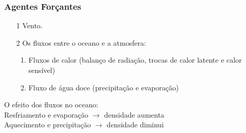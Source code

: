 
\begin{frame}
  \frametitle{Agentes Forçantes}
  \begin{itemize}[<+-| alert@+>]
    \item[1] Vento.
    \item[2] Os fluxos entre o oceano e a atmosfera:
    \begin{enumerate}[<+-| alert@+>]
      \item Fluxos de calor (balanço de radiação, trocas de calor latente e
            calor sensível)
      \item Fluxo de água doce (precipitação e evaporação)
    \end{enumerate}
  \end{itemize}

  \pause
  \begin{block}{}
  O efeito dos fluxos no oceano:\\
  Resfriamento e evaporação $\rightarrow$ densidade aumenta\\
  Aquecimento e precipitação $\rightarrow$ densidade diminui
  \end{block}

\end{frame}


